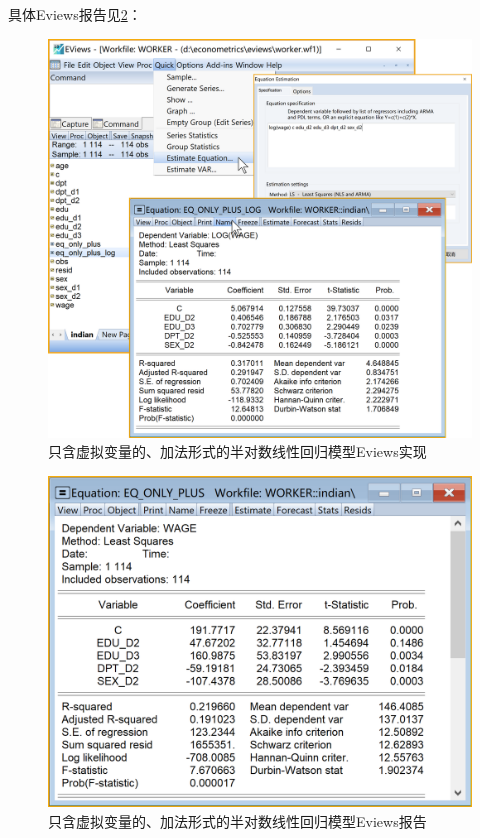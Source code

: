 \documentclass[12pt,(landscape,a4paper),(portrait,a4paper)]{article}
\theoremstyle{definition}
\theoremstyle{definition}
\theoremstyle{definition}
\theoremstyle{remark}
\begin{document}
具体Eviews报告见\ref{fig:only-plus-log-report}：

\begin{figure}

{\centering \includegraphics[width=27.03in]{picture/lab8-dummy-model/2-only-plus-log} 

}

\caption{只含虚拟变量的、加法形式的半对数线性回归模型Eviews实现}\label{fig:only-plus-log}
\end{figure}

\begin{figure}

{\centering \includegraphics[width=19.4in]{picture/lab8-dummy-model/2-only-plus-report} 

}

\caption{只含虚拟变量的、加法形式的半对数线性回归模型Eviews报告}\label{fig:only-plus-log-report}
\end{figure}
\end{document}
